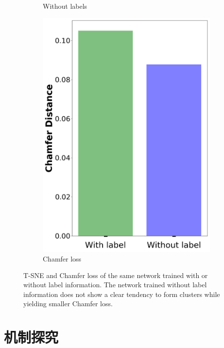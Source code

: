 \documentclass[bachelor, nocolorlinks, printoneside]{seuthesis} %
\begin{document}
\begin{Main}
\begin{figure}
\begin{subfigure}[t]{0.3\linewidth}
    \caption{Without labels}\label{fig:T-SNE2}
  \end{subfigure}
  \hspace{0.05\linewidth}
  \begin{subfigure}[t]{0.2\linewidth} \centering
    \includegraphics[width=\columnwidth]{figs/label-or-not.png}
    \caption{Chamfer loss}\label{fig:T-SNE3}
  \end{subfigure}
  \caption{\small T-SNE and Chamfer loss of the same network trained with or without label information. The network trained without label information does not show a clear tendency to form clusters while yielding smaller Chamfer loss.}\label{fig:T-SNE}
\end{figure}

\chapter{机制探究}

\end{Main}
\end{document}
